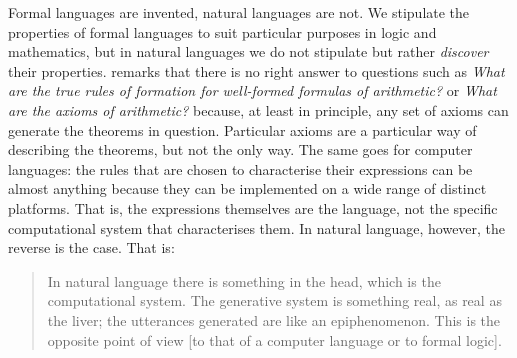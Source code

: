 Formal languages are invented, natural languages are not. We stipulate the properties of formal languages to suit particular purposes in logic and mathematics, but in natural languages we do not stipulate but rather \textit{discover} their properties. \citet{Chomsky2002} remarks that there is no right answer to questions such as \textit{What are the true rules of formation for well-formed formulas of arithmetic?} or \textit{What are the axioms of arithmetic?} because, at least in principle, any set of axioms can generate the theorems in question. Particular axioms are a particular way of describing the theorems, but not the only way. The same goes for computer languages: the rules that are chosen to characterise their expressions can be almost anything because they can be implemented on a wide range of distinct platforms. That is, the expressions themselves are the language, not the specific computational system that characterises them. In natural language, however, the reverse is the case. That is:
\begin{quote}
In natural language there is something in the head, which is the computational system. The generative system is something real, as real as the liver; the utterances generated are like an epiphenomenon. This is the opposite point of view [to that of a computer language or to formal logic]. \citep[110]{Chomsky2002}
\end{quote}

